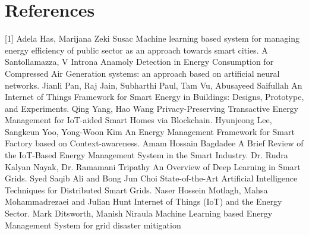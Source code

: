 \documentclass[journal]{IEEEtran}
\begin{document}
\section*{References}
[1] Adela Has, Marijana Zeki Susac Machine learning based system for managing energy efficiency of public sector as an approach towards smart cities.
 \newline
[2] A Santollamazza, V Introna Anamoly Detection in Energy Consumption for Compressed Air Generation systems: an approach based on artificial neural networks.
 \newline
[3] Jianli Pan, Raj Jain, Subharthi Paul, Tam Vu, Abusayeed Saifullah An Internet of Things Framework for Smart Energy in Buildings: Designs, Prototype, and Experiments.
 \newline
[4] Qing Yang, Hao Wang Privacy-Preserving Transactive Energy Management for IoT-aided Smart Homes via Blockchain.
 \newline
[5] Hyunjeong Lee, Sangkeun Yoo, Yong-Woon Kim An Energy Management Framework for Smart Factory based on Context-awareness.
 \newline
[6] Amam Hossain Bagdadee A Brief Review of the IoT-Based Energy Management System in the Smart Industry.
 \newline
[7] Dr. Rudra Kalyan Nayak, Dr. Ramamani Tripathy An Overview of Deep Learning in Smart Grids.
 \newline
[8] Syed Saqib Ali and Bong Jun Choi State-of-the-Art Artificial Intelligence Techniques for Distributed Smart Grids.
 \newline
[9] Naser Hossein Motlagh, Mahsa Mohammadrezaei and Julian Hunt Internet of Things (IoT) and the Energy Sector.
 \newline
[10] Mark Ditsworth, Manish Niraula Machine Learning based Energy Management System for grid disaster mitigation
\end{document}
